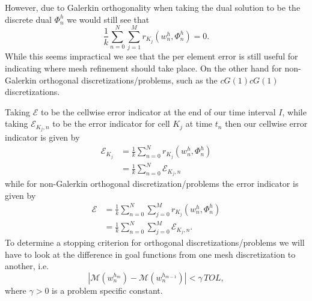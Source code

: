 However, due to Galerkin orthogonality when taking the dual solution to be
the discrete dual $\Phi^h_n$ we would still see that
\begin{equation*}
    \frac{1}{k} \sum_{n=0}^N \sum_{j=1}^M r_{K_j}(w^h_n, \Phi^h_n) = 0.
\end{equation*}
While this seems impractical we see that the per element error is still useful
for indicating where mesh refinement should take place. On the other hand for
non-Galerkin orthogonal discretizations/problems, such as the $cG(1)cG(1)$
discretizations.

Taking $\mathcal{E}$ to be the cellwise error indicator at the end of our time
interval $I$, while taking $\mathcal{E}_{K_j, n}$ to be
the error indicator for cell $K_j$ at time $t_n$ then our cellwise error
indicator is given by
\begin{equation}
    \begin{split}
        \mathcal{E}_{K_j} &= \frac{1}{k} \sum_{n=0}^N r_{K_j}(w^h_n, \Phi^h_n) \\
                &= \frac{1}{k} \sum_{n=0}^N \mathcal{E}_{K_j, n}
    \end{split}
    \label{eq:CellErrorIndicator}
\end{equation}
while for non-Galerkin orthogonal discretization/problems the error indicator is
given by
\begin{equation}
    \begin{split}
        \mathcal{E} &= \frac{1}{k} \sum_{n=0}^N \sum_{j=0}^M r_{K_j}(w^h_n, \Phi^h_n) \\
            &= \frac{1}{k} \sum_{n=0}^N \sum_{j=0}^M  \mathcal{E}_{K_j, n}.
    \end{split}
    \label{eq:ErrorIndicator}
\end{equation}
To determine a stopping criterion for orthogonal discretizations/problems we
will have to look at the difference in goal functions from one mesh
discretization to another, i.e.
\begin{equation}
     \left|\mathcal{M}(w^{h_m}_n) - \mathcal{M}(w^{h_{m-1}}_n)\right|
        < \gamma\, TOL,
    \label{eq:OrthogonalError}
\end{equation}
where $\gamma>0$ is a problem specific constant.

